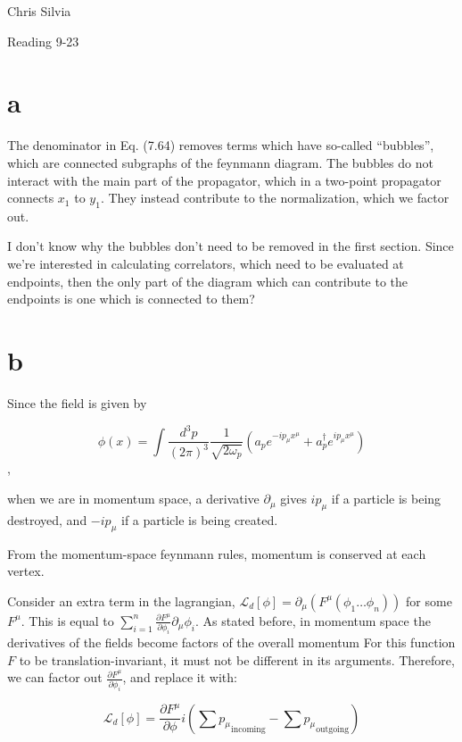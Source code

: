 \documentclass{article}
\begin{document}
\begin{flushright}

Chris Silvia

Reading 9-23

\end{flushright}

\section{a}

The denominator in Eq. (7.64) removes terms which have so-called ``bubbles'',
	which are connected subgraphs of the feynmann diagram.
The bubbles do not interact with the main part of the propagator,
	which in a two-point propagator connects $x_1$ to $y_1$.
They instead contribute to the normalization, which we factor out.

I don't know why the bubbles don't need to be removed in the first section.
Since we're interested in calculating correlators, which need to be evaluated
	at endpoints, then the only part of the diagram which can contribute
	to the endpoints is one which is connected to them?

\section{b}

Since the field is given by

\[ \phi(x) = \int \frac{d^3 p}{(2 \pi)^3} \frac{1}{\sqrt{2 \omega_p}}
	\left( a_p e^{-i p_\mu x^\mu} + a_p^\dagger e^{i p_\mu x^\mu} \right) \],

when we are in momentum space, a derivative $\partial_\mu$ gives $i p_\mu$ 
	if a particle is being destroyed, and $- i p_\mu$ if a particle is being created.

From the momentum-space feynmann rules, momentum is conserved at each vertex.

Consider an extra term in the lagrangian, 
	$\mathcal{L}_d[\phi] = \partial_\mu \left( F^\mu(\phi_1 \dots \phi_n) \right)$
	for some $F^\mu$.
This is equal to $\sum_{i=1}^n \frac{\partial F^\mu}{\partial \phi_i}
		\partial_\mu \phi_i$.
As stated before, in momentum space the derivatives of the fields become
	factors of the overall momentum
For this function $F$ to be translation-invariant, it must not be different
	in its arguments.
Therefore, we can factor out $\frac{\partial F^\mu}{\partial \phi_i}$,
	and replace it with:

\[ \mathcal{L}_d [\phi] = \frac{\partial F^\mu}{\partial \phi} i
	\left( {\sum p_\mu}_{\textrm{incoming}} - {\sum p_\mu}_{\textrm{outgoing}} \right) \]
\end{document}
